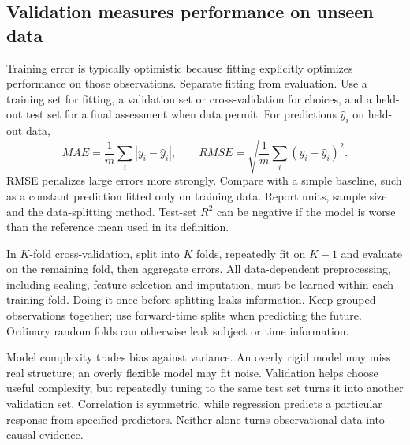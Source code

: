 \subsection{Validation measures performance on unseen data}
Training error is typically optimistic because fitting explicitly optimizes
performance on those observations. Separate fitting from evaluation.
Use a training set for fitting, a validation set or cross-validation for
choices, and a held-out test set for a final assessment when data permit.
For predictions $\hat y_i$ on held-out data,
\[
MAE=\frac1m\sum_i|y_i-\hat y_i|,\qquad
RMSE=\sqrt{\frac1m\sum_i(y_i-\hat y_i)^2}.
\]
RMSE penalizes large errors more strongly. Compare with a simple baseline,
such as a constant prediction fitted only on training data. Report units,
sample size and the data-splitting method. Test-set $R^2$ can be negative
if the model is worse than the reference mean used in its definition.

In $K$-fold cross-validation, split into $K$ folds, repeatedly fit on $K-1$
and evaluate on the remaining fold, then aggregate errors. All data-dependent
preprocessing, including scaling, feature selection and imputation, must
be learned within each training fold. Doing it once before splitting leaks
information. Keep grouped observations together; use forward-time splits
when predicting the future. Ordinary random folds can otherwise leak
subject or time information.

Model complexity trades bias against variance. An overly rigid model may
miss real structure; an overly flexible model may fit noise. Validation
helps choose useful complexity, but repeatedly tuning to the same test set
turns it into another validation set. Correlation is symmetric, while
regression predicts a particular response from specified predictors. Neither
alone turns observational data into causal evidence.

\clearpage

